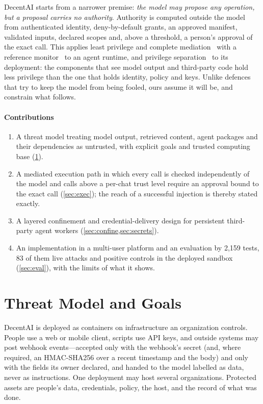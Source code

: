 \documentclass[10pt,twocolumn,a4paper]{article}
\newcommand{\sys}{DecentAI}
\begin{document}
\sys{} starts from a narrower premise: \emph{the model may propose any
operation, but a proposal carries no authority}. Authority is computed
outside the model from authenticated identity, deny-by-default grants,
an approved manifest, validated inputs, declared scopes and, above a
threshold, a person's approval of the exact call. This applies least
privilege and complete mediation~\cite{saltzer1975protection} with a
reference monitor~\cite{anderson1972planning} to an agent runtime, and
privilege separation~\cite{provos2003privsep} to its deployment: the
components that see model output and third-party code hold less
privilege than the one that holds identity, policy and keys. Unlike
defences that try to keep the model from being fooled, ours assume it
will be, and constrain what follows.

\paragraph{Contributions}
\begin{enumerate}
  \item A threat model treating model output, retrieved content, agent
  packages and their dependencies as untrusted, with explicit goals and
  trusted computing base (\cref{sec:threat}).
  \item A mediated execution path in which every call is checked
  independently of the model and calls above a per-chat trust level
  require an approval bound to the exact call (\cref{sec:exec}); the
  reach of a successful injection is thereby stated exactly.
  \item A layered confinement and credential-delivery design for
  persistent third-party agent workers (\cref{sec:confine,sec:secrets}).
  \item An implementation in a multi-user platform and an evaluation by
  2{,}159 tests, 83 of them live attacks and positive controls in the
  deployed sandbox
  (\cref{sec:eval}), with the limits of what it shows.
\end{enumerate}

\section{Threat Model and Goals}
\label{sec:threat}

\sys{} is deployed as containers on infrastructure an organization
controls. People use a web or mobile client, scripts use API keys, and
outside systems may post webhook events---accepted only with the
webhook's secret (and, where required, an HMAC-SHA256 over a recent
timestamp and the body) and only with the fields its owner declared,
and handed to the model labelled as data, never as instructions. One
deployment may host several organizations. Protected assets are people's data, credentials,
policy, the host, and the record of what was done.
\end{document}
